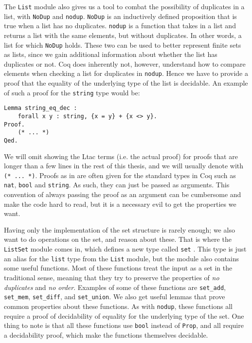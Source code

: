 The \lstinline{List} module also gives us a tool to combat the possibility of duplicates in a list,
with \lstinline{NoDup} and \lstinline{nodup}.
\lstinline{NoDup} is an inductively defined proposition that is true when a list has no duplicates.
\lstinline{nodup} is a function that takes in a list and returns a list with the same elements, but without duplicates.
In other words, a list for which \lstinline{NoDup} holds.
These two can be used to better represent finite sets as lists, since
we gain additional information about whether the list has duplicates or not.
Coq does inherently not, however, understand how to compare elements when checking a list for duplicates in \lstinline{nodup}.
Hence we have to provide a proof that the equality of the underlying type of the list is decidable.
An example of such a proof for the \lstinline{string} type would be:

\begin{minipage}{\linewidth}
\begin{lstlisting}[language=Coq, label={lst:string_eq_dec}, caption={Decidability proof for string equality in Coq}]
Lemma string_eq_dec :
    forall x y : string, {x = y} + {x <> y}.
Proof.
    (* ... *)
Qed.
\end{lstlisting}
\end{minipage}

We will omit showing the Ltac terms (i.e. the actual proof) for proofs that are longer than a few lines in the rest of this thesis,
and we will usually denote  with \lstinline{(* ... *)}.
Proofs as in  are often given for the standard types in Coq such as \lstinline{nat},
\lstinline{bool} and \lstinline{string}.
As such, they can just be passed as arguments.
This convention of always passing the proof as an argument can be cumbersome and make the code hard to read,
but it is a necessary evil to get the properties we want.

Having only the implementation of the set structure is rarely enough; we also want to do operations on the set, and reason about these.
That is where the \lstinline{ListSet} module comes in, which defines a new type called \lstinline{set} \cite{coqlistset}.
This type is just an alias for the \lstinline{list} type from the \lstinline{List} module,
but the module also contains some useful functions.
Most of these functions treat the input as a set in the traditional sense,
meaning that they try to preserve the properties of \emph{no duplicates} and \emph{no order}.
Examples of some of these functions are \lstinline{set_add}, \lstinline{set_mem},
\lstinline{set_diff}, and \lstinline{set_union}.
We also get useful lemmas that prove common properties about these functions.
As with \lstinline{nodup}, these functions all require a proof of decidability of equality for the underlying type of the set.
One thing to note is that all these functions use \lstinline{bool} instead of
\lstinline{Prop}, and all require a decidability proof, which make the functions themselves decidable.

